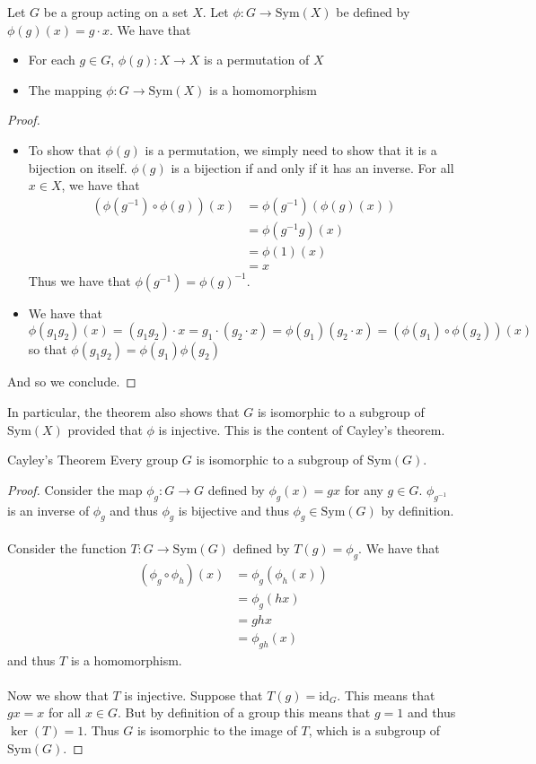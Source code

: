 \documentclass[a4paper]{article}
\begin{document}
\begin{thm}{}{} Let $G$ be a group acting on a set $X$. Let $\phi:G\to\text{Sym}(X)$ be defined by $\phi(g)(x)=g\cdot x$. We have that 
\begin{itemize}
\item For each $g\in G$, $\phi(g):X\to X$ is a permutation of $X$
\item The mapping $\phi:G\to\text{Sym}(X)$ is a homomorphism
\end{itemize}\tcbline
\begin{proof}~\\
\begin{itemize}
\item To show that $\phi(g)$ is a permutation, we simply need to show that it is a bijection on itself. $\phi(g)$ is a bijection if and only if it has an inverse. For all $x\in X$, we have that 
\begin{align*}
(\phi(g^{-1})\circ\phi(g))(x)&=\phi(g^{-1})(\phi(g)(x))\\
&=\phi(g^{-1}g)(x)\\
&=\phi(1)(x)\\
&=x
\end{align*} Thus we have that $\phi(g^{-1})=\phi(g)^{-1}$. 
\item We have that $$\phi(g_1g_2)(x)=(g_1g_2)\cdot x=g_1\cdot(g_2\cdot x)=\phi(g_1)(g_2\cdot x)=(\phi(g_1)\circ\phi(g_2))(x)$$ so that $\phi(g_1g_2)=\phi(g_1)\phi(g_2)$
\end{itemize}
And so we conclude. 
\end{proof}
\end{thm}

In particular, the theorem also shows that $G$ is isomorphic to a subgroup of $\text{Sym}(X)$ provided that $\phi$ is injective. This is the content of Cayley's theorem. 

\begin{thm}{Cayley's Theorem}{} Every group $G$ is isomorphic to a subgroup of $\text{Sym}(G)$. \tcbline
\begin{proof}
Consider the map $\phi_g:G\to G$ defined by $\phi_g(x)=gx$ for any $g\in G$. $\phi_{g^{-1}}$ is an inverse of $\phi_g$ and thus $\phi_g$ is bijective and thus $\phi_g\in\text{Sym}(G)$ by definition. \\~\\
Consider the function $T:G\to\text{Sym}(G)$ defined by $T(g)=\phi_g$. We have that 
\begin{align*}
(\phi_g\circ\phi_h)(x)&=\phi_g(\phi_h(x))\\
&=\phi_g(hx)\\
&=ghx\\
&=\phi_{gh}(x)
\end{align*}
and thus $T$ is a homomorphism. \\~\\
Now we show that $T$ is injective. Suppose that $T(g)=\text{id}_G$. This means that $gx=x$ for all $x\in G$. But by definition of a group this means that $g=1$ and thus $\ker(T)=1$. Thus $G$ is isomorphic to the image of $T$, which is a subgroup of $\text{Sym}(G)$. 
\end{proof}
\end{thm}
\end{document}
